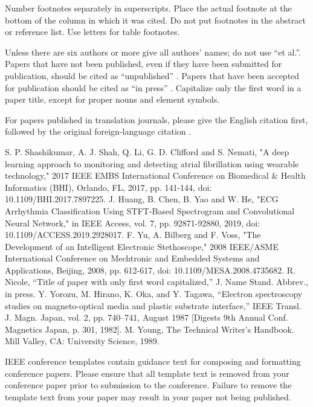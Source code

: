 \documentclass[conference]{IEEEtran}
\begin{document}
Number footnotes separately in superscripts. Place the actual footnote at 
the bottom of the column in which it was cited. Do not put footnotes in the 
abstract or reference list. Use letters for table footnotes.

Unless there are six authors or more give all authors' names; do not use 
``et al.''. Papers that have not been published, even if they have been 
submitted for publication, should be cited as ``unpublished'' \cite{b4}. Papers 
that have been accepted for publication should be cited as ``in press'' \cite{b5}. 
Capitalize only the first word in a paper title, except for proper nouns and 
element symbols.

For papers published in translation journals, please give the English 
citation first, followed by the original foreign-language citation \cite{b6}.

\begin{thebibliography}{00}
 S. P. Shashikumar, A. J. Shah, Q. Li, G. D. Clifford and S. Nemati, "A deep learning approach to monitoring and detecting atrial fibrillation using wearable technology," 2017 IEEE EMBS International Conference on Biomedical \& Health Informatics (BHI), Orlando, FL, 2017, pp. 141-144, doi: 10.1109/BHI.2017.7897225.
 J. Huang, B. Chen, B. Yao and W. He, "ECG Arrhythmia Classification Using STFT-Based Spectrogram and Convolutional Neural Network," in IEEE Access, vol. 7, pp. 92871-92880, 2019, doi: 10.1109/ACCESS.2019.2928017.
 F. Yu, A. Bilberg and F. Voss, "The Development of an Intelligent Electronic Stethoscope," 2008 IEEE/ASME International Conference on Mechtronic and Embedded Systems and Applications, Beijing, 2008, pp. 612-617, doi: 10.1109/MESA.2008.4735682.
 R. Nicole, ``Title of paper with only first word capitalized,'' J. Name Stand. Abbrev., in press.
 Y. Yorozu, M. Hirano, K. Oka, and Y. Tagawa, ``Electron spectroscopy studies on magneto-optical media and plastic substrate interface,'' IEEE Transl. J. Magn. Japan, vol. 2, pp. 740--741, August 1987 [Digests 9th Annual Conf. Magnetics Japan, p. 301, 1982].
 M. Young, The Technical Writer's Handbook. Mill Valley, CA: University Science, 1989.
\end{thebibliography}
\vspace{12pt}
\color{red}
IEEE conference templates contain guidance text for composing and formatting conference papers. Please ensure that all template text is removed from your conference paper prior to submission to the conference. Failure to remove the template text from your paper may result in your paper not being published.
\end{document}
